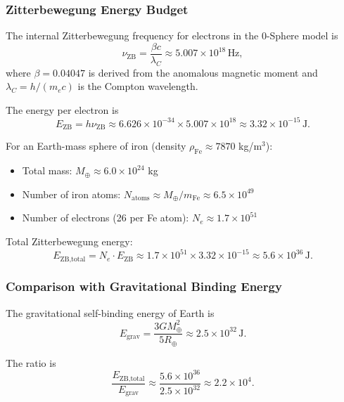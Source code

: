 \documentclass[
 reprint,
 amsmath,amssymb,
 aps,
 prb,
]{revtex4-2}
\numberwithin{equation}{section}
\begin{document}
\subsubsection{Zitterbewegung Energy Budget}

The internal Zitterbewegung frequency for electrons in the 0-Sphere model is \cite{Hanamura2024spin}
\begin{equation}
\nu_{\text{ZB}} = \frac{\beta c}{\lambda_C} \approx 5.007 \times 10^{18}\,\text{Hz},
\end{equation}
where $\beta = 0.04047$ is derived from the anomalous magnetic moment and $\lambda_C = h/(m_e c)$ is the Compton wavelength.

The energy per electron is
\begin{equation}
E_{\text{ZB}} = h\nu_{\text{ZB}} \approx 6.626 \times 10^{-34} \times 5.007 \times 10^{18} \approx 3.32 \times 10^{-15}\,\text{J}.
\end{equation}

For an Earth-mass sphere of iron (density $\rho_{\text{Fe}} \approx 7870$ kg/m$^3$):
\begin{itemize}
\item Total mass: $M_{\oplus} \approx 6.0 \times 10^{24}$ kg
\item Number of iron atoms: $N_{\text{atoms}} \approx M_{\oplus}/m_{\text{Fe}} \approx 6.5 \times 10^{49}$
\item Number of electrons (26 per Fe atom): $N_e \approx 1.7 \times 10^{51}$
\end{itemize}

Total Zitterbewegung energy:
\begin{equation}
E_{\text{ZB,total}} = N_e \cdot E_{\text{ZB}} \approx 1.7 \times 10^{51} \times 3.32 \times 10^{-15} \approx 5.6 \times 10^{36}\,\text{J}.
\end{equation}

\subsubsection{Comparison with Gravitational Binding Energy}

The gravitational self-binding energy of Earth is
\begin{equation}
E_{\text{grav}} = \frac{3GM_{\oplus}^2}{5R_{\oplus}} \approx 2.5 \times 10^{32}\,\text{J}.
\end{equation}

The ratio is
\begin{equation}
\frac{E_{\text{ZB,total}}}{E_{\text{grav}}} \approx \frac{5.6 \times 10^{36}}{2.5 \times 10^{32}} \approx 2.2 \times 10^4.
\end{equation}
\end{document}
